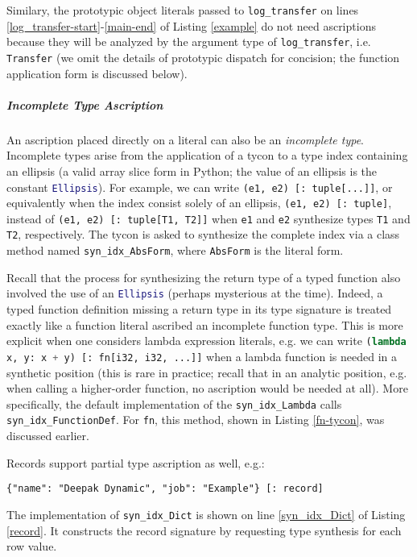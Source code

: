 \documentclass[preprint,10pt]{sigplanconf}
\newcommand{\lip}[1]{\lstinline[language=Python,basicstyle=\ttfamily\small,deletendkeywords={tuple,buffer,map}]{#1}}
\begin{document}
Similary, the prototypic object literals passed to \lip{log_transfer} on lines \ref{log_transfer-start}-\ref{main-end} of Listing \ref{example} do not need ascriptions because they will be analyzed by the  argument type of \lip{log_transfer}, i.e. \lip{Transfer} (we omit the details of prototypic dispatch for concision; the function application form is discussed below).

\subparagraph{Incomplete Type Ascription} An ascription placed directly on a literal can also be an \emph{incomplete type}. Incomplete types arise from the application of a tycon to a type index containing an ellipsis (a valid array slice form in Python; the value of an ellipsis is the constant \lip{Ellipsis}). For example, we can write \lstinline[basicstyle=\ttfamily\small]{(e1, e2) [: tuple[...]]}, or equivalently when the index consist solely of an ellipsis, \lstinline[basicstyle=\ttfamily\small]{(e1, e2) [: tuple]}, instead of \lstinline[basicstyle=\ttfamily\small]{(e1, e2) [: tuple[T1, T2]]} when \lstinline[basicstyle=\ttfamily\small]{e1} and \lstinline[basicstyle=\ttfamily\small]{e2} synthesize types \lstinline[basicstyle=\ttfamily\small]{T1} and \lip{T2}, respectively. The tycon is asked to synthesize the complete index via a class method named \lip{syn_idx_AbsForm}, where \lip{AbsForm} is the literal form. 

Recall that the process for synthesizing the return type of a typed function also involved the use of an \lip{Ellipsis} (perhaps mysterious at the time). Indeed, a typed function definition missing a return type in its type signature is treated exactly like a   function literal ascribed an incomplete function type. This is more explicit when one considers lambda expression literals, e.g. we can write \lip{(lambda x, y: x + y) [: fn[i32, i32, ...]]} when a lambda function is needed in a synthetic position (this is rare in practice; recall that in an analytic position, e.g. when calling a higher-order function, no ascription would be needed at all). 
More specifically, the default implementation of the \lip{syn_idx_Lambda} calls \lip{syn_idx_FunctionDef}. For \lip{fn}, this method, shown in Listing \ref{fn-tycon}, was discussed earlier.


Records support partial type ascription as well, e.g.: 
\vspace{3px}
\begin{lstlisting}[numbers=none,basicstyle=\ttfamily\scriptsize]
{"name": "Deepak Dynamic", "job": "Example"} [: record]
\end{lstlisting}
The implementation of \lip{syn_idx_Dict} is shown on line \ref{syn_idx_Dict} of Listing \ref{record}. It constructs the record signature by requesting type synthesis for each row value.
\end{document}
